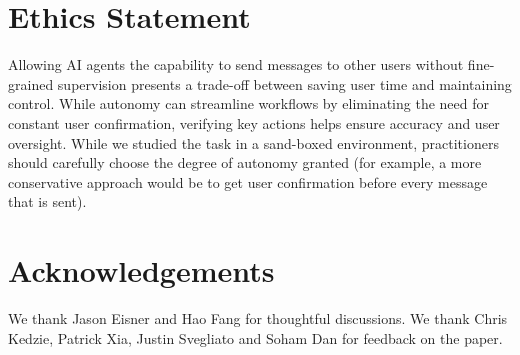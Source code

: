 \section*{Ethics Statement}
Allowing AI agents the capability to send messages to other users without fine-grained supervision presents a trade-off between saving user time and maintaining control. While autonomy can streamline workflows by eliminating the need for constant user confirmation, verifying key actions helps ensure accuracy and user oversight. While we studied the task in a sand-boxed environment, practitioners should carefully choose the degree of autonomy granted (for example, a more conservative approach would be to get user confirmation before every message that is sent). %

\section*{Acknowledgements}
We thank Jason Eisner and Hao Fang for thoughtful discussions. We thank Chris Kedzie, Patrick Xia, Justin Svegliato and Soham Dan for feedback on the paper.

